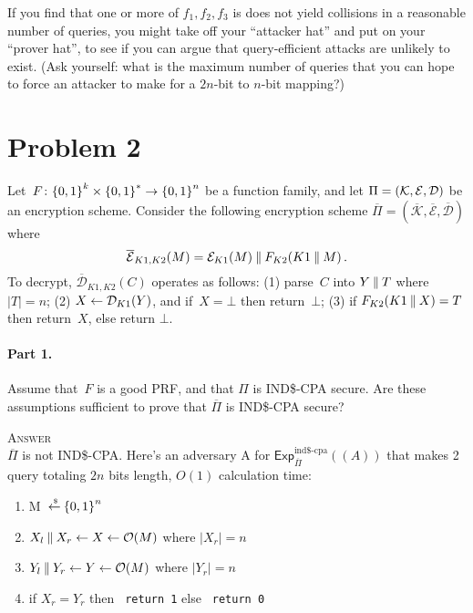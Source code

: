\documentclass[11pt]{article}
\begin{document}
If you find that one or more of $f_1,f_2,f_3$ is does not yield
collisions in a reasonable number of queries, you might take off your
``attacker hat'' and put on your ``prover hat'', to see if you can
argue that query-efficient attacks are unlikely to exist.  (Ask
yourself: what is the maximum number of queries that you can hope to
force an attacker to make for a $2n$-bit to $n$-bit mapping?)

\newcommand{\oPi}{\overline{\Pi}}
\newcommand{\ocalK}{\overline{\mathcal{K}}}
\newcommand{\ocalE}{\overline{\mathcal{E}}}
\newcommand{\ocalD}{\overline{\mathcal{D}}}

\vspace*{-.25in}
\section*{Problem 2} Let~$F \colon {\{0,1\}}^k \times {\{0,1\}}^* \to {\{0,1\}}^n$
be a function family, and let $\Pi = ({\cal K},{\cal E},{\cal D})$ be an
encryption scheme.  Consider the following encryption scheme $\oPi =
(\ocalK,\ocalE,\ocalD)$ where 
\[
\ocalE_{K1,K2}(M) = \calE_{K1}(M)\concat F_{K2}(K1 \concat M)\, .
\]  
To decrypt, $\ocalD_{K1,K2}(C)$
operates as follows: (1) parse~$C$ into $Y \:\|\: T$ where $|T|=n$; (2) $X
\gets {\cal D}_{K1}(Y)$, and if~$X = \bot$ then return~$\bot$; (3) if
$F_{K2}(K1 \:\|\: X)=T$ then return~$X$, else return $\bot$.

\paragraph{Part 1.} Assume that~$F$ is a good PRF, and that $\Pi$ is IND\$-CPA secure.
Are these assumptions sufficient to prove that $\oPi$ is IND\$-CPA
secure?

\newcommand{\INDR}{IND\$-CPA}
\newcommand{\ExpINDz}[2]{\mathsf{Exp}^{\mathrm{ind}\mbox{-}\mathrm{cpa0}}_{#1}{(#2)}}
\newcommand{\ExpINDo}[2]{\mathsf{Exp}^{\mathrm{ind}\mbox{-}\mathrm{cpa1}}_{#1}{(#2)}}
\newcommand{\ExpINDR}[2]{\mathsf{Exp}^{\mathrm{ind\$}\mbox{-}\mathrm{cpa}}_{#1}{(#2)}}
\newcommand{\AdvINDR}[2]{\Adv^{\mathrm{ind\$}\mbox{-}\mathrm{cpa}}_{#1}(#2)}

\textsc{Answer} 
\\$\oPi$ is not \INDR. Here's an adversary A for $\ExpINDR{\oPi}{(A)}$ that makes 2 query totaling $2n$ bits length, $O(1)$ calculation time:
\begin{enumerate}
\item M ${\:\stackrel{{\scriptscriptstyle \hspace{0.2em}\$}} {\leftarrow}\:} {\{0,1\}}^n$
\item $X_l \:\|\: X_r \gets X \gets {\cal O}(M)$ where $|X_r| = n$
\item $Y_l \:\|\: Y_r \gets Y \gets {\cal O}(M)$ where $|Y_r| = n$
\item if $X_r = Y_r$ then \texttt{ return 1} else \texttt{ return 0}
\end{enumerate}
\end{document}
